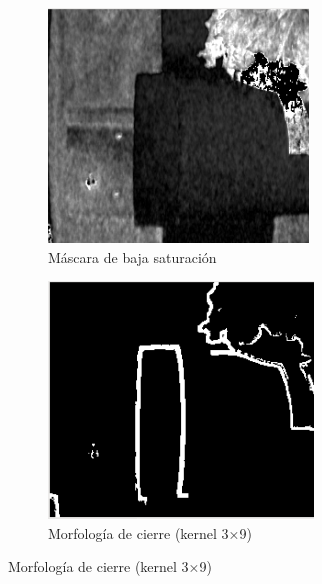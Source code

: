 \begin{figure}[H]
\begin{subfigure}[b]{0.48\textwidth}
    \centering
    \includegraphics[width=\textwidth]{imagenes/detector_tubos_3_canal_s.png}
    \caption{Máscara de baja saturación}
\end{subfigure}
\hfill
\begin{subfigure}[b]{0.48\textwidth}
    \centering
    \includegraphics[width=\textwidth]{imagenes/detector_tubos_5_morfologia.png}
    \caption{Morfología de cierre (kernel 3×9)}
\end{subfigure}


\end{figure}
